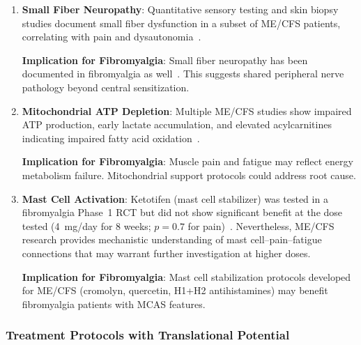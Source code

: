 \begin{enumerate}
    \item \textbf{Small Fiber Neuropathy}: Quantitative sensory testing and skin biopsy studies document small fiber dysfunction in a subset of ME/CFS patients, correlating with pain and dysautonomia~\cite{Azcue2023sfn}.

    \textbf{Implication for Fibromyalgia}: Small fiber neuropathy has been documented in fibromyalgia as well~\cite{Oaklander2013sfn}. This suggests shared peripheral nerve pathology beyond central sensitization.

    \item \textbf{Mitochondrial ATP Depletion}: Multiple ME/CFS studies show impaired ATP production, early lactate accumulation, and elevated acylcarnitines indicating impaired fatty acid oxidation~\cite{Naviaux2016metabolomics,Syed2025}.

    \textbf{Implication for Fibromyalgia}: Muscle pain and fatigue may reflect energy metabolism failure. Mitochondrial support protocols could address root cause.

    \item \textbf{Mast Cell Activation}: Ketotifen (mast cell stabilizer) was tested in a fibromyalgia Phase~1 RCT but did not show significant benefit at the dose tested (4~mg/day for 8 weeks; $p = 0.7$ for pain)~\cite{Moldofsky2015}. Nevertheless, ME/CFS research provides mechanistic understanding of mast cell--pain--fatigue connections that may warrant further investigation at higher doses.

    \textbf{Implication for Fibromyalgia}: Mast cell stabilization protocols developed for ME/CFS (cromolyn, quercetin, H1+H2 antihistamines) may benefit fibromyalgia patients with MCAS features.
\end{enumerate}

\subsubsection{Treatment Protocols with Translational Potential}

